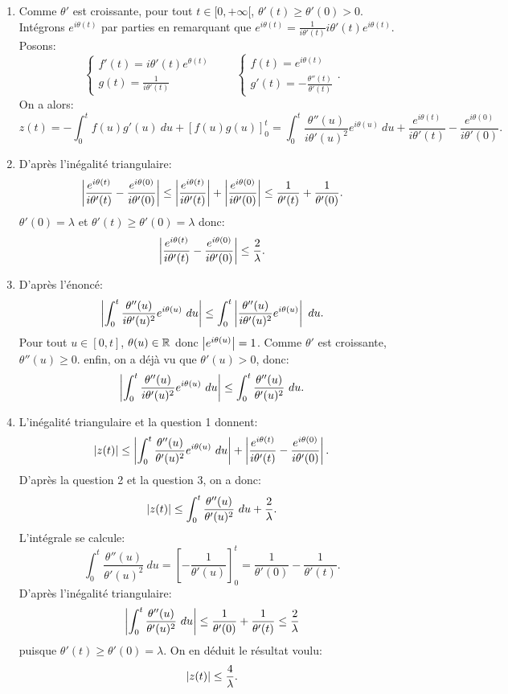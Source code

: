 \begin{enumerate}
\item Comme $\theta'$ est croissante, pour tout $t\in [0,+\infty[$, $\theta'(t)\geq \theta'(0) >0$. Intégrons $e^{i\theta(t)}$ par parties en remarquant que $\displaystyle{e^{i\theta(t)} = \frac{1}{i\theta'(t)}i\theta'(t)e^{i\theta(t)}}$. Posons:
\[ \left \{ \begin{array}{ll}
              f'(t) = i\theta'(t)e^{\theta(t)}\\
              g(t) = \frac{1}{i\theta'(t)}
            \end{array}
    \right.  \qquad \left \{ \begin{array}{ll}
                                f(t) = e^{i\theta(t)}\\
                                g'(t) = -\frac{\theta''(t)}{\theta'(t)}
                              \end{array}
                     \right. .
\]
On a alors:
\[
 z(t)  = -\int_{0}^{t} f(u)g'(u)\ du  + [f(u)g(u)]_{0}^{t}  
  = \int_{0}^{t}\frac{\theta''(u)}{i\theta'(u)^{2}}e^{i\theta(u)}\ du + \frac{e^{i\theta(t)}}{i\theta'(t)}-\frac{e^{i\theta(0)}}{i\theta'(0)}.
\]
 
\item D'après l'inégalité triangulaire:
\[ 
\left\vert\frac{e^{i\theta(t)}}{i\theta'(t)}-\frac{e^{i\theta(0)}}{i\theta'(0)}\right\vert \leq \left\vert\frac{e^{i\theta(t)}}{i\theta'(t)}\right\vert+\left\vert\frac{e^{i\theta(0)}}{i\theta'(0)}\right\vert \leq \frac{1}{\theta'(t)} + \frac{1}{\theta'(0)}.  
\]
$\theta'(0) = \lambda$ et $\theta'(t)\geq \theta'(0) = \lambda$ donc:
\[
\left\vert\frac{e^{i\theta(t)}}{i\theta'(t)}-\frac{e^{i\theta(0)}}{i\theta'(0)}\right\vert \leq \frac{2}{\lambda}.  
\]

\item D'après l'énoncé:
\[  
\abs{\int_{0}^{t}\frac{\theta''(u)}{i\theta'(u)^{2}}e^{i\theta(u)}\ du} 
\leq \int_{0}^{t}\abs{\frac{\theta''(u)}{i\theta'(u)^{2}}e^{i\theta(u)}}\ du. 
\]
Pour tout $u\in [0,t]$, $\theta(u)\in \mathbb{R}$ donc $\left\vert e^{i\theta(u)}\right\vert = 1$. Comme $\theta'$ est croissante, $\theta''(u)\geq 0$. enfin, on a déjà vu que $\theta'(u)>0$, donc:
\[  
\abs{\int_{0}^{t}\frac{\theta''(u)}{i\theta'(u)^{2}}e^{i\theta(u)}\ du} \leq \int_{0}^{t}\frac{\theta''(u)}{\theta'(u)^{2}}\ du.  
\]

\item L'inégalité triangulaire et la question 1 donnent: 
\[ 
\left\vert z(t)\right\vert \leq \left\vert\int_{0}^{t}\frac{\theta''(u)}{\theta'(u)^{2}}e^{i\theta(u)}\ du\right\vert + \left\vert\frac{e^{i\theta(t)}}{i\theta'(t)}-\frac{e^{i\theta(0)}}{i\theta'(0)}\right\vert.
\]
D'après la question 2 et la question 3, on a donc:
\[  
\left\vert z(t)\right\vert \leq\int_{0}^{t}\frac{\theta''(u)}{\theta'(u)^{2}}\ du + \frac{2}{\lambda}.  
\]
L'intégrale se calcule:
\[ 
\int_{0}^{t}\frac{\theta''(u)}{\theta'(u)^{2}}\ du = \left [  -\frac{1}{\theta'(u)}   \right ]_{0}^{t} = \frac{1}{\theta'(0)}-\frac{1}{\theta'(t)}.  
\]
D'après l'inégalité triangulaire:
\[  
\abs{\int_{0}^{t}\frac{\theta''(u)}{\theta'(u)^{2}}\ du} \leq \frac{1}{\theta'(0)} + \frac{1}{\theta'(t)} \leq \frac{2}{\lambda}  
\]
puisque $\theta'(t)\geq \theta'(0) = \lambda$. On en déduit le résultat voulu:
\[  
\left\vert z(t)\right\vert\leq \frac{4}{\lambda}.  
\]
\end{enumerate}
